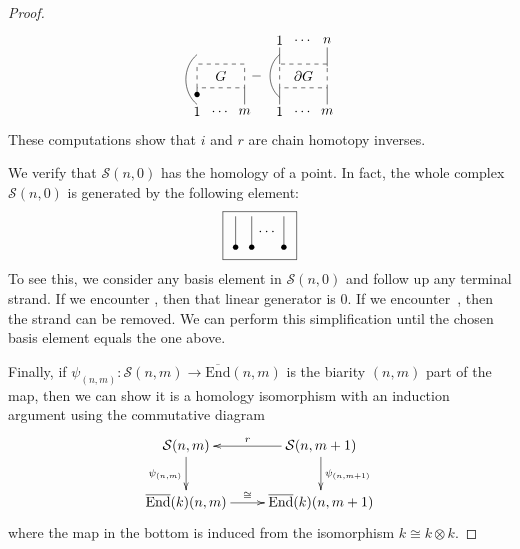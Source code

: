 \documentclass{amsart}
\renewcommand{\S}{\mathcal{S}}
\newcommand{\tensor}{\otimes}
\newcommand{\End}{\mathrm{End}}
\theoremstyle{definition}
\begin{document}
\begin{proof}
\begin{equation*}
{\begin{tikzpicture}[scale=.6]
			\draw [dashed] (0,0) rectangle (2,1); \node at (1, .5) {$G$};
			
			\node at (0,-.3){$\bullet$}; \draw (0,-.3) -- (0,0);
			\node at (0,-1) {$1$}; \draw (0,-.7)  to[out=140,in=-140]  (0,1.4);
			\node at (1,-1) {$\dots$};
			\node at (2,-1) {$m$}; \draw (2,-.7) -- (2,0);
			
			\node at (2.5,.5) {$-$}; 
			\end{tikzpicture}		
			\begin{tikzpicture}[scale=.6]
			\node at (0,2) {$1$}; \draw (0,1.7) -- (0,1);
			\node at (1,2) {$\dots$};
			\node at (2,2) {$n$}; \draw (2,1.7) -- (2,.9);
			
			\draw [dashed] (0,0) rectangle (2,1); \node at (1, .5) {$\partial G$};
			
			\draw (0,-.4)  to[out=140,in=-140]  (0,1.4);
			\node at (0,-1) {$1$}; \draw (0,-.7) -- (0,0);
			\node at (1,-1) {$\dots$};
			\node at (2,-1) {$m$}; \draw (2,-.7) -- (2,0);
			\end{tikzpicture}
		}\end{equation*}
		These computations show that $i$ and $r$ are chain homotopy inverses. 
		
		We verify that $\S(n,0)$ has the homology of a point. In fact, the whole complex $\S(n,0)$ is generated by the following element:
		\begin{equation*}
			\boxed{\begin{tikzpicture}[scale=.4]
				\node at (0,0){$\bullet$}; \draw (0,0) -- (0,2);
				\node at (1,0){$\bullet$}; \draw (1,0) -- (1,2);
				\node at (3,0){$\bullet$}; \draw (3,0) -- (3,2);
				\node at (2,1){$\cdots$}; 
				\end{tikzpicture}}
		\end{equation*}
		To see this, we consider any basis element in $\S(n,0)$ and follow up any terminal strand. If we encounter \product , then that linear generator is $0$. If we encounter \coproduct\,, then the strand can be removed. We can perform this simplification until the chosen basis element equals the one above.
		
		Finally, if $\psi_{(n,m)}:\S(n,m)\to\overline{\End}(n,m)$ is the biarity $(n,m)$ part of the map, then we can show it is a homology isomorphism with an induction argument using the commutative diagram
		$$
		\xymatrix{
			\S(n,m) \ar[d]_{\psi_{(n,m)}} & \S(n,m+1) \ar[d]^{\psi_{(n,m+1)}} \ar[l]_-{r} \\
			\overline{\End}(k)(n,m) \ar[r]^-{\cong} & \overline{\End}(k)(n,m+1) }
		$$
		where the map in the bottom is induced from the isomorphism $k\cong k\tensor k$.
	\end{proof}
	
\end{document}
